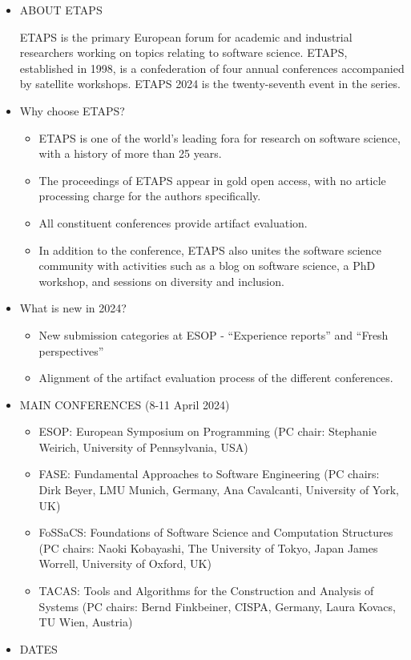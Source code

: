 \documentclass[prodmode,acmtecs]{acmsmall} %
\begin{document}
\begin{itemize}\item  ABOUT ETAPS  
 
  ETAPS is the primary European forum for academic and industrial researchers working on topics relating to software science. ETAPS, established in 1998, is a confederation of four annual conferences accompanied by satellite workshops. ETAPS 2024 is the twenty-seventh event in the series.  
 
\item  Why choose ETAPS? 
 
\begin{itemize}\item  ETAPS is one of the world's leading fora for research on software science, with a history of more than 25 years.
\item  The proceedings of ETAPS appear in gold open access, with no article processing charge for the authors specifically.
\item  All constituent conferences provide artifact evaluation.
\item  In addition to the conference, ETAPS also unites the software science community with activities such as a blog on software science, a PhD workshop, and sessions on diversity and inclusion.
\end{itemize} 
\item  What is new in 2024?  
 
\begin{itemize}\item  New submission categories at ESOP - ``Experience reports'' and ``Fresh perspectives''
\item  Alignment of the artifact evaluation process of the different conferences.
\end{itemize} 
\item  MAIN CONFERENCES (8-11 April 2024) 
 
\begin{itemize}\item  ESOP: European Symposium on Programming (PC chair: Stephanie Weirich, University of Pennsylvania, USA)
\item  FASE: Fundamental Approaches to Software Engineering (PC chairs: Dirk Beyer, LMU Munich, Germany, Ana Cavalcanti, University of York, UK)
\item  FoSSaCS: Foundations of Software Science and Computation Structures (PC chairs: Naoki Kobayashi, The University of Tokyo, Japan James Worrell, University of Oxford, UK)
\item  TACAS: Tools and Algorithms for the Construction and Analysis of Systems (PC chairs: Bernd Finkbeiner, CISPA, Germany, Laura Kovacs, TU Wien, Austria)
\end{itemize} 
\item  DATES 
 

\end{itemize}
\end{document}
